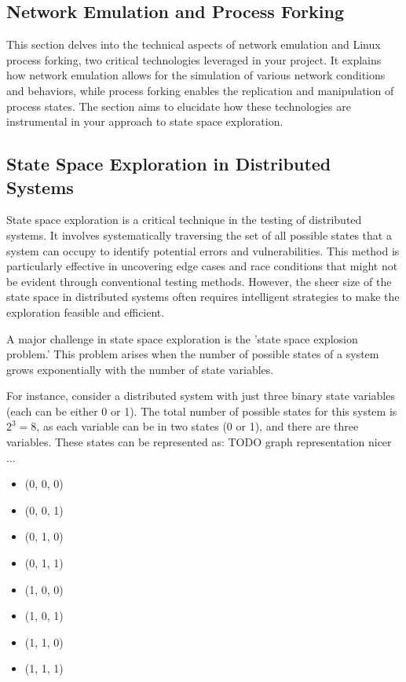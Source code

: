 \documentclass[a4paper,11pt,oneside]{report}
\begin{document}
\subsection{Network Emulation and Process Forking}
This section delves into the technical aspects of network emulation and Linux process forking, two critical technologies leveraged in your project. It explains how network emulation allows for the simulation of various network conditions and behaviors, while process forking enables the replication and manipulation of process states. The section aims to elucidate how these technologies are instrumental in your approach to state space exploration.

\subsection{State Space Exploration in Distributed Systems}
State space exploration is a critical technique in the testing of distributed systems. It involves systematically traversing the set of all possible states that a system can occupy to identify potential errors and vulnerabilities. This method is particularly effective in uncovering edge cases and race conditions that might not be evident through conventional testing methods. However, the sheer size of the state space in distributed systems often requires intelligent strategies to make the exploration feasible and efficient.

A major challenge in state space exploration is the 'state space explosion problem.' This problem arises when the number of possible states of a system grows exponentially with the number of state variables.

For instance, consider a distributed system with just three binary state variables (each can be either 0 or 1). The total number of possible states for this system is \(2^3 = 8\), as each variable can be in two states (0 or 1), and there are three variables. These states can be represented as:
TODO graph representation nicer ...

\begin{itemize}
    \item (0, 0, 0)
    \item (0, 0, 1)
    \item (0, 1, 0)
    \item (0, 1, 1)
    \item (1, 0, 0)
    \item (1, 0, 1)
    \item (1, 1, 0)
    \item (1, 1, 1)
\end{itemize}
\end{document}
